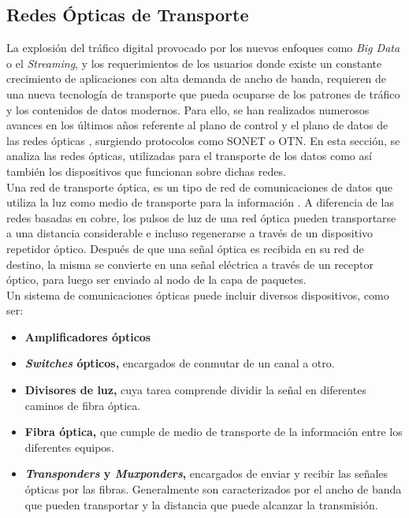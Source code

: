 \subsection{Redes Ópticas de Transporte}
La explosión del tráfico digital provocado por los nuevos enfoques como \textit{Big Data} o el \textit{Streaming}, y los requerimientos de los usuarios donde existe un constante crecimiento de aplicaciones con alta demanda de ancho de banda, requieren de una nueva tecnología de transporte que pueda ocuparse de los patrones de tráfico y los contenidos de datos modernos. Para ello, se han realizados numerosos avances en los últimos años referente al plano de control y el plano de datos de las redes ópticas \parencite{redesopticas}, surgiendo protocolos como SONET o OTN. En esta sección, se analiza las redes ópticas, utilizadas para el transporte de los datos como así también los dispositivos que funcionan sobre dichas redes. 
\\

Una red de transporte óptica, es un tipo de red de comunicaciones de datos que utiliza la luz como medio de transporte para la información \parencite{redesopticasdef}. A diferencia de las redes basadas en cobre, los pulsos de luz de una red óptica pueden transportarse a una distancia considerable e incluso regenerarse a través de un dispositivo repetidor óptico. Después de que una señal óptica es recibida en su red de destino, la misma se convierte en una señal eléctrica a través de un receptor óptico, para luego ser enviado al nodo de la capa de paquetes. 
\\

Un sistema de comunicaciones ópticas puede incluir diversos dispositivos, como ser:

\begin{itemize}
	\item \textbf{Amplificadores ópticos} 
	\item \textbf{\textit{Switches} ópticos,} encargados de conmutar de un canal a otro.
	\item \textbf{Divisores de luz,} cuya tarea comprende dividir la señal en diferentes caminos de fibra óptica.
	\item \textbf{Fibra óptica,} que cumple de medio de transporte de la información entre los diferentes equipos.
	\item \textbf{\textit{Transponders} y \textit{Muxponders},} encargados de enviar y recibir las señales ópticas por las fibras. Generalmente son caracterizados por el ancho de banda que pueden transportar y la distancia que puede alcanzar la transmisión.
\end{itemize}

